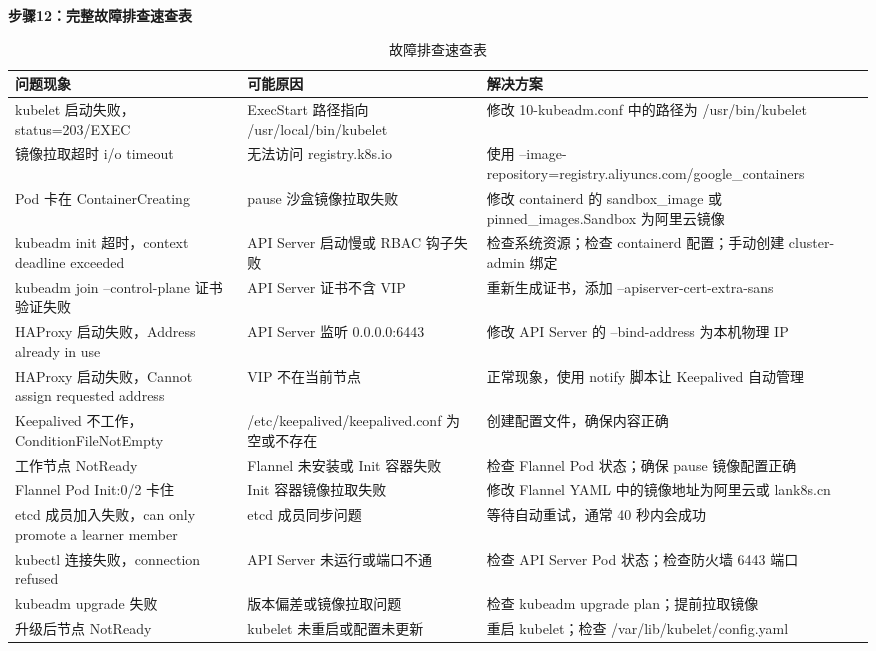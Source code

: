 \documentclass[12pt,UTF8]{ctexbook}
\begin{document}
\textbf{步骤12：完整故障排查速查表}

\begin{table}[htbp]
    \centering
    \begin{tabular}{|p{5cm}|p{5cm}|p{5cm}|}
        \hline
        \textbf{问题现象} & \textbf{可能原因} & \textbf{解决方案} \\
        \hline
        kubelet 启动失败，status=203/EXEC & ExecStart 路径指向 /usr/local/bin/kubelet & 修改 10-kubeadm.conf 中的路径为 /usr/bin/kubelet \\
        \hline
        镜像拉取超时 i/o timeout & 无法访问 registry.k8s.io & 使用 --image-repository=registry.aliyuncs.com/google\_containers \\
        \hline
        Pod 卡在 ContainerCreating & pause 沙盒镜像拉取失败 & 修改 containerd 的 sandbox\_image 或 pinned\_images.Sandbox 为阿里云镜像 \\
        \hline
        kubeadm init 超时，context deadline exceeded & API Server 启动慢或 RBAC 钩子失败 & 检查系统资源；检查 containerd 配置；手动创建 cluster-admin 绑定 \\
        \hline
        kubeadm join --control-plane 证书验证失败 & API Server 证书不含 VIP & 重新生成证书，添加 --apiserver-cert-extra-sans \\
        \hline
        HAProxy 启动失败，Address already in use & API Server 监听 0.0.0.0:6443 & 修改 API Server 的 --bind-address 为本机物理 IP \\
        \hline
        HAProxy 启动失败，Cannot assign requested address & VIP 不在当前节点 & 正常现象，使用 notify 脚本让 Keepalived 自动管理 \\
        \hline
        Keepalived 不工作，ConditionFileNotEmpty & /etc/keepalived/keepalived.conf 为空或不存在 & 创建配置文件，确保内容正确 \\
        \hline
        工作节点 NotReady & Flannel 未安装或 Init 容器失败 & 检查 Flannel Pod 状态；确保 pause 镜像配置正确 \\
        \hline
        Flannel Pod Init:0/2 卡住 & Init 容器镜像拉取失败 & 修改 Flannel YAML 中的镜像地址为阿里云或 lank8s.cn \\
        \hline
        etcd 成员加入失败，can only promote a learner member & etcd 成员同步问题 & 等待自动重试，通常 40 秒内会成功 \\
        \hline
        kubectl 连接失败，connection refused & API Server 未运行或端口不通 & 检查 API Server Pod 状态；检查防火墙 6443 端口 \\
        \hline
        kubeadm upgrade 失败 & 版本偏差或镜像拉取问题 & 检查 kubeadm upgrade plan；提前拉取镜像 \\
        \hline
        升级后节点 NotReady & kubelet 未重启或配置未更新 & 重启 kubelet；检查 /var/lib/kubelet/config.yaml \\
        \hline
    \end{tabular}
    \caption{故障排查速查表}
\end{table}
\end{document}
